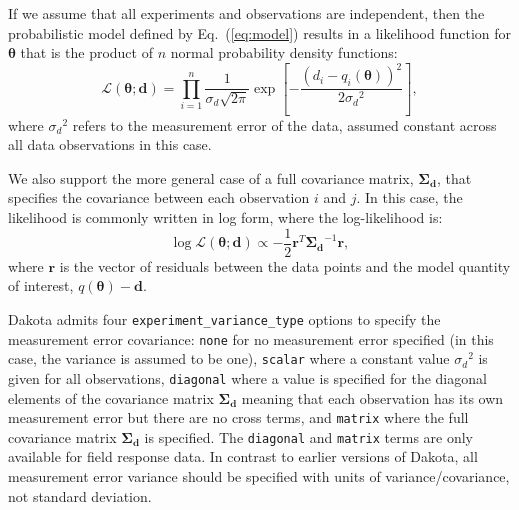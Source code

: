 If we assume that all experiments and observations are independent,
then the probabilistic model defined by Eq.~(\ref{eq:model}) results
in a likelihood function for $\boldsymbol{\theta}$ that is the product
of $n$ normal probability density functions:
\begin{equation}\label{eqn:Likelihood}  
\mathcal{L}(\boldsymbol{{\theta};d}) = \prod_{i=1}^n
\frac{1}{\sigma_d \sqrt{2\pi}} \exp
\left[ - \frac{\left(d_i-q_i(\boldsymbol{{\theta}})\right)^2}{2{\sigma_d}^2} \right],
\end{equation}
where ${\sigma_d}^2$ refers to the measurement error of the data,
assumed constant across all data observations in this case.

We also support the more general case of a full covariance matrix,
$\boldsymbol{\Sigma_d}$, that specifies the covariance between each
observation $i$ and $j$.  In this case, the likelihood is commonly
written in log form, where the log-likelihood
is: %
\begin{equation}\label{eqn:LogLikelihood}  
\log{\mathcal{L}(\boldsymbol{{\theta};d})} \propto %
-\frac{1}{2} \boldsymbol{r}^T \boldsymbol{\Sigma_d}^{-1} \boldsymbol{r},
\end{equation}
where $\boldsymbol{r}$ is the vector of residuals between the data
points and the model quantity of interest,
$q(\boldsymbol{\theta})-\boldsymbol{d}$.

Dakota admits four \texttt{experiment\_variance\_type} options to specify the
measurement error covariance: \texttt{none} for no measurement error
specified (in this case, the variance is assumed to be one),
\texttt{scalar} where a constant value ${\sigma_d}^2$ is given for all
observations, \texttt{diagonal} where a value is specified for the
diagonal elements of the covariance matrix $\boldsymbol{\Sigma_d}$
meaning that each observation has its own measurement error but there
are no cross terms, and \texttt{matrix} where the full covariance
matrix $\boldsymbol{\Sigma_d}$ is specified.  The \texttt{diagonal}
and \texttt{matrix} terms are only available for field response data.
In contrast to earlier versions of Dakota, all measurement error
variance should be specified with units of variance/covariance, not
standard deviation.


